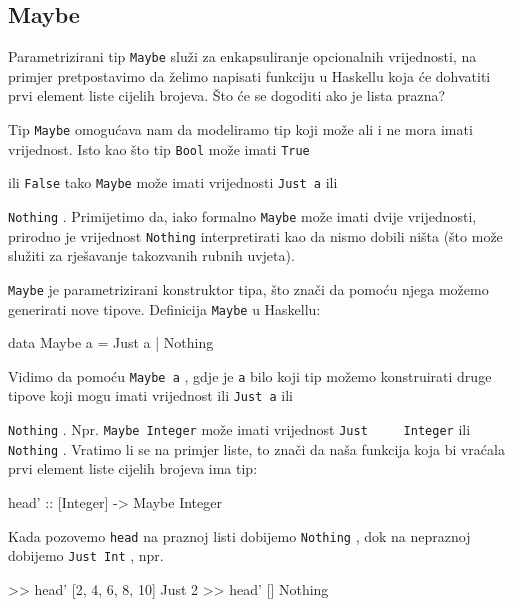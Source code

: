 \documentclass[11pt]{article}
\newcommand{\codei}[1]{
  {\lstinline[basicstyle=\ttfamily]{#1}}
}
\theoremstyle{definition}
\begin{document}
  \subsection{Maybe}
  Parametrizirani tip \codei{Maybe} služi za enkapsuliranje opcionalnih
  vrijednosti, na primjer pretpostavimo da želimo napisati funkciju u Haskellu koja će
  dohvatiti prvi element liste cijelih brojeva. Što će se dogoditi ako je lista prazna?

  Tip \codei{Maybe} omogućava nam da modeliramo tip koji može ali i ne mora
  imati vrijednost. Isto kao što tip \codei{Bool} može imati \codei{True}
  ili \codei{False} tako \codei{Maybe} može imati vrijednosti \codei{Just a} ili
  \codei{Nothing}. Primijetimo da, iako formalno \codei{Maybe} može imati dvije
  vrijednosti, prirodno je vrijednost \codei{Nothing} interpretirati kao da nismo dobili ništa (što može
  služiti za rješavanje takozvanih rubnih uvjeta).

  \codei{Maybe} je parametrizirani konstruktor tipa, što znači da pomoću njega možemo generirati nove tipove. Definicija \codei{Maybe} u
  Haskellu:
  \begin{mcode}
    data Maybe a = Just a | Nothing
  \end{mcode}
  Vidimo da pomoću \codei{Maybe a}, gdje je \codei{a} bilo koji tip možemo
  konstruirati druge tipove koji mogu imati vrijednost ili \codei{Just a} ili
  \codei{Nothing}. Npr. \codei{Maybe Integer} može imati vrijednost \codei{Just
    Integer} ili \codei{Nothing}. Vratimo li se na primjer liste, to znači da naša funkcija
  koja bi vraćala prvi element liste cijelih brojeva ima tip:
  \begin{mcode}
    head' :: [Integer] -> Maybe Integer
  \end{mcode}
  Kada pozovemo \codei{head} na praznoj listi dobijemo \codei{Nothing}, dok na
  nepraznoj dobijemo \codei{Just Int}, npr.
  \begin{mcode}
    >> head' [2, 4, 6, 8, 10]
    Just 2
    >> head' []
    Nothing
  \end{mcode}
\end{document}
